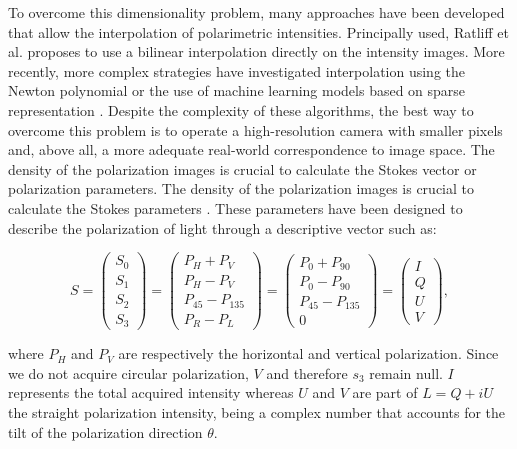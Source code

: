 To overcome this dimensionality problem, many approaches have been developed that allow the interpolation of polarimetric intensities. Principally used, Ratliff et al. \cite{ratliff2009interpolation} proposes to use a bilinear interpolation directly on the intensity images. More recently, more complex strategies have investigated interpolation using the Newton polynomial \cite{li2019demosaicking} or the use of machine learning models based on sparse representation \cite{zhang2018sparse}.
Despite the complexity of these algorithms, the best way to overcome this problem is to operate a high-resolution camera with smaller pixels and, above all, a more adequate real-world correspondence to image space.
The density of the polarization images is crucial to calculate the Stokes vector or polarization parameters.
The density of the polarization images is crucial to calculate the Stokes parameters \cite{stokes1851composition}.
These parameters have been designed to describe the polarization of light through a descriptive vector such as:

\begin{equation}
S = \begin{pmatrix}S_0\\S_1\\S_2\\S_3\end{pmatrix} = \begin{pmatrix}P_H + P_V\\ P_H - P_V\\ P_{45} - P_{135} \\ P_R - P_L\end{pmatrix} = \begin{pmatrix}P_0 + P_{90}\\ P_0 - P_{90}\\ P_{45} - P_{135} \\ 0\end{pmatrix} = \begin{pmatrix}I\\ Q\\ U \\ V\end{pmatrix},
\end{equation}

where $P_H$ and $P_V$ are respectively the horizontal and vertical polarization. Since we do not acquire circular polarization, $V$ and therefore $s_3$ remain null. $I$ represents the total acquired intensity whereas $U$ and $V$ are part of $L = Q + iU$ the straight polarization intensity, being a complex number that accounts for the tilt of the polarization direction $\theta$.

